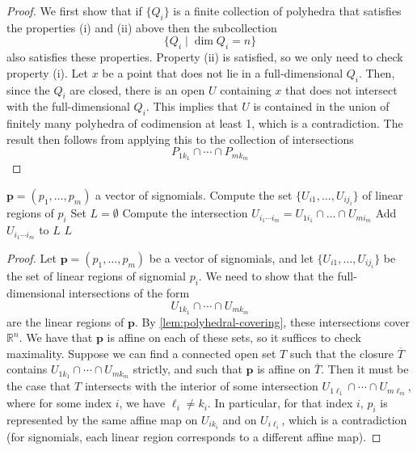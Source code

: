 \documentclass[10pt]{article}
\newtheorem{proposition}[theorem]{Proposition}
\theoremstyle{definition}
\theoremstyle{remark}
\newcommand{\RR}{{\mathbb{R}}}
\renewcommand{\vec}[1]{\mathbf{#1}}
\def\vp{{\vec{p}}}
\begin{document}
\begin{proof}
    We first show that if $\{Q_i\}$ is a finite collection of polyhedra that satisfies the properties (i) and (ii) above then the subcollection
    $$
    \{ Q_i \mid \dim Q_i = n\}
    $$
    also satisfies these properties.
    Property (ii) is satisfied, so we only need to check property (i).
    Let $x$ be a point that does not lie in a full-dimensional $Q_i$. Then, since the $Q_i$ are closed, there is an open $U$ containing $x$ that does not intersect with the full-dimensional $Q_i$. This implies that $U$ is contained in the union of finitely many polyhedra of codimension at least 1, which is a contradiction.
    The result then follows from applying this to the collection of intersections
    $$
    P_{1k_1} \cap \dotsb \cap P_{mk_m}
    $$
\end{proof}

\begin{algorithm}
    \begin{algorithmic}[1]
        \Require $\vp = (p_1, \dotsc, p_m)$ a vector of signomials.
        \State Compute the set $\{ U_{i1}, \dotsc, U_{ij_i}\}$ of linear regions of $p_i$
        \State Set $L = \emptyset$
            \State Compute the intersection $U_{i_1\dotsb i_m} = U_{1i_1} \cap \dotsc \cap U_{mi_m}$
            \State Add $U_{i_1\dotsb i_m}$ to $L$
            \EndIf
        \EndFor
        \Return $L$
    \end{algorithmic}
    \caption{Computation of linear regions for vectors of signomials}
    \label{alg:linear-regions-signomial}
\end{algorithm}


\begin{proof}
    Let $\vp=(p_1, \dotsc, p_m)$ be a vector of signomials, and let $\{U_{i1}, \dotsc, U_{ij_i}\}$ be the set of linear regions of signomial $p_i$. We need to show that the full-dimensional intersections of the form
    $$
    U_{1k_1} \cap \dotsb \cap U_{mk_m}
    $$
    are the linear regions of $\vp$. By \cref{lem:polyhedral-covering}, these intersections cover $\RR^n$. We have that $\vp$ is affine on each of these sets, so it suffices to check maximality. Suppose we can find a connected open set $T$ such that the closure $\overline T$ contains $U_{1k_1} \cap \dotsb \cap U_{mk_m}$ strictly, and such that $\vp$ is affine on $\overline T$. Then it must be the case that $T$ intersects with the interior of some intersection $U_{1\ell_1} \cap \dotsb \cap U_{m\ell_m}$, where for some index $i$, we have $\ell_i \ne k_i$. 
    In particular, for that index $i$, $p_i$ is represented by the same affine map on $U_{ik_i}$ and on $U_{i\ell_i}$, which is a contradiction (for signomials, each linear region corresponds to a different affine map).
\end{proof}
\end{document}

